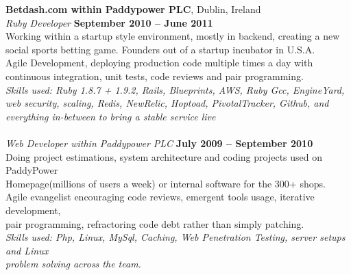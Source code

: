 \documentclass[margin,line]{resume}
\begin{document}
\begin{resume}
       \textbf{Betdash.com within Paddypower PLC}, Dublin, Ireland \vspace{2mm}\\\vspace{1mm}%
      \textsl{Ruby Developer} \hfill \textbf{September 2010 -- June 2011}\\
	Working within a startup style environment, mostly in backend, creating a new social sports betting game. Founders out of a startup incubator in U.S.A. \\
	Agile Development, deploying production code multiple times a day with continuous integration, unit tests, code reviews and pair programming. \vspace{1mm} \\%
	\textsl{Skills used: Ruby 1.8.7 + 1.9.2, Rails, Blueprints, AWS, Ruby Gcc, EngineYard, web security, scaling, Redis, NewRelic, Hoptoad, PivotalTracker, Github, and everything in-between to bring a stable service live  } \vspace{1mm} \\
       \\ \textsl{Web Developer within Paddypower PLC} \hfill \textbf{July 2009 -- September 2010}\\
	Doing project estimations, system architecture and coding projects used on PaddyPower \\ Homepage(millions of users a week) or internal software for the 300+ shops. \vspace{1mm}\\%
	Agile evangelist encouraging code reviews, emergent tools usage, iterative development, \\ pair programming, refractoring code debt rather than simply patching. \vspace{1mm}\\%
    \textsl{Skills used: Php, Linux, MySql, Caching, Web Penetration Testing, server setups and Linux \\ problem solving across the team. } \vspace{1mm}\\%



\end{resume}
\end{document}
